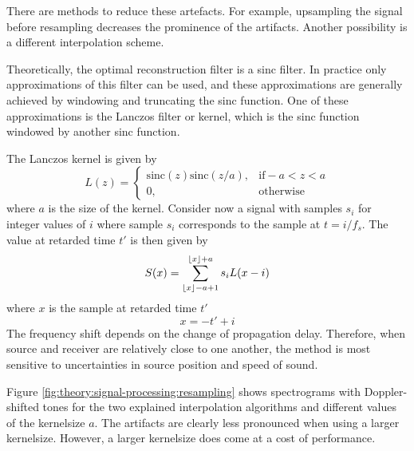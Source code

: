 There are methods to reduce these artefacts. For example, upsampling the signal before resampling decreases the prominence of the artifacts.
Another possibility is a different interpolation scheme.

Theoretically, the optimal reconstruction filter is a sinc filter. In practice
only approximations of this filter can be used, and these approximations are
generally achieved by windowing and truncating the sinc function. One of these
approximations is the Lanczos filter or kernel, which is the sinc function
windowed by another sinc function.

The Lanczos kernel is given by
\begin{equation}
 L(z) = \begin{cases}
         \textrm{sinc}(z) \textrm{sinc}(z/a), & \textrm{if} -a < z < a \\
         0, & \text{otherwise}
        \end{cases}
\end{equation}
where $a$ is the size of the kernel. Consider now a signal with samples $s_i$
for integer values of $i$ where sample $s_i$ corresponds to the sample at $t=i/f_s$.
The value at retarded time $t'$ is then given by
\begin{equation}
 S(x) = \sum_{\lfloor x\rfloor - a + 1}^{\lfloor x\rfloor + a} s_i L(x-i)
\end{equation}
where $x$ is the sample at retarded time $t'$
\begin{equation}
 x = -t' + i
\end{equation}
The frequency shift depends on the change of propagation delay. Therefore, when source and receiver are relatively close to one another, the method is most sensitive to uncertainties in source position and speed of sound.

Figure \ref{fig:theory:signal-processing:resampling} shows spectrograms with
Doppler-shifted tones for the two explained interpolation algorithms and
different values of the kernelsize $a$. The artifacts are clearly less
pronounced when using a larger kernelsize. However, a larger kernelsize does
come at a cost of performance.

